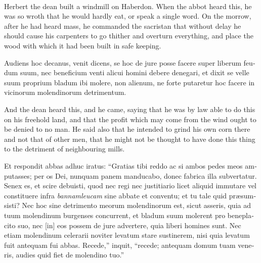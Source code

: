 \documentclass{book}
\newcounter{engnote}
\newcommand{\engnotenum}{\textsuperscript{\arabic{engnote}\stepcounter{engnote}}}
\begin{document}
\begin{paracol}{2}
\begin{otherlanguage}{latin}
\end{otherlanguage}

\switchcolumn

Herbert the dean\engnotenum{} built a windmill on Haberdon.\engnotenum{} When the abbot heard this, he was so wroth that he would hardly eat, or speak a single word. On the morrow, after he had heard mass, he commanded the sacristan that without delay he should cause his carpenters to go thither and overturn everything, and place the wood with which it had been built in safe keeping.

\switchcolumn*

\begin{otherlanguage}{latin}
Audiens hoc decanus, venit dicens, se hoc de jure posse facere super liberum feudum suum, nec beneficium venti alicui homini debere denegari, et dixit se velle suum proprium bladum ibi molere, non alienum, ne forte putaretur hoc facere in vicinorum molendinorum detrimentum.
\end{otherlanguage}

\switchcolumn

And the dean heard this, and he came, saying that he was by law able to do this on his freehold land, and that the profit which may come from the wind ought to be denied to no man. He said also that he intended to grind his own corn there and not that of other men, that he might not be thought to have done this thing to the detriment of neighbouring mills.

\switchcolumn*

\begin{otherlanguage}{latin}
Et respondit abbas adhuc iratus: ``Gratias tibi reddo ac si ambos pedes meos amputasses; per os Dei, nunquam panem manducabo, donec fabrica illa subvertatur. Senex es, et scire debuisti, quod nec regi nec justitiario licet aliquid immutare vel constituere infra \emph{bannamleucam} sine abbate et conventu; et tu tale quid pr\ae{}sumsisti? Nec hoc sine detrimento meorum molendinorum est, sicut asseris, quia ad tuum molendinum burgenses concurrent, et bladum suum molerent pro beneplacito suo, nec [in] eos possem de jure advertere, quia liberi homines sunt. Nec etiam molendinum celerarii noviter levatum stare sustinerem, nisi quia levatum fuit antequam fui abbas. Recede,'' inquit, ``recede; antequam domum tuam veneris, audies quid fiet de molendino tuo.''
\end{otherlanguage}

\switchcolumn


\end{paracol}
\end{document}
